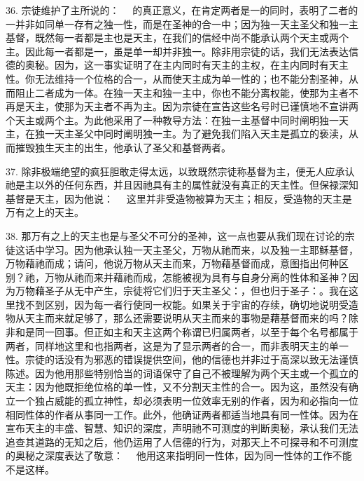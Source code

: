 36. 宗徒维护了主所说的：　 的真正意义，在肯定两者是一的同时，表明了二者的一并非如同单一存有之独一性，而是在圣神的合一中；因为独一天主圣父和独一主基督，既然每一者都是主也是天主，在我们的信经中尚不能承认两个天主或两个主。因此每一者都是一，虽是单一却并非独一。除非用宗徒的话，我们无法表达信德的奥秘。因为，这一事实证明了在主内同时有天主的主权，在主内同时有天主性。你无法维持一个位格的合一，从而使天主成为单一性的；也不能分割圣神，从而阻止二者成为一体。在独一天主和独一主中，你也不能分离权能，使那为主者不再是天主，使那为天主者不再为主。因为宗徒在宣告这些名号时已谨慎地不宣讲两个天主或两个主。为此他采用了一种教导方法：在独一主基督中同时阐明独一天主，在独一天主圣父中同时阐明独一主。为了避免我们陷入天主是孤立的亵渎，从而摧毁独生天主的出生，他承认了圣父和基督两者。\par

37. 除非极端绝望的疯狂胆敢走得太远，以致既然宗徒称基督为主，便无人应承认祂是主以外的任何东西，并且因祂具有主的属性就没有真正的天主性。但保禄深知基督是天主，因为他说：　 这里并非受造物被算为天主；相反，受造物的天主是万有之上的天主。\par

38. 那万有之上的天主也是与圣父不可分的圣神，这一点也要从我们现在讨论的宗徒这话中学习。因为他承认独一天主圣父，万物从祂而来，以及独一主耶稣基督，万物藉祂而成；请问，他说万物从天主而来，万物藉基督而成，意图指出何种区别？祂，万物从祂而来并藉祂而成，怎能被视为具有与自身分离的性体和圣神？因为万物藉圣子从无中产生，宗徒将它们归于天主圣父：，但也归于圣子：。我在这里找不到区别，因为每一者行使同一权能。如果关于宇宙的存续，确切地说明受造物从天主而来就足够了，那么还需要说明从天主而来的事物是藉基督而来的吗？除非和是同一回事。但正如主和天主这两个称谓已归属两者，以至于每个名号都属于两者，同样地这里和也指两者，这是为了显示两者的合一，而非表明天主的单一性。宗徒的话没有为邪恶的错误提供空间，他的信德也并非过于高深以致无法谨慎陈述。因为他用那些特别恰当的词语保守了自己不被理解为两个天主或一个孤立的天主：因为他既拒绝位格的单一性，又不分割天主性的合一。因为这，虽然没有确立一个独占威能的孤立神性，却必须表明一位效率无别的作者，因为和必指向一位相同性体的作者从事同一工作。此外，他确证两者都适当地具有同一性体。因为在宣布天主的丰盛、智慧、知识的深度，声明祂不可测度的判断奥秘，承认我们无法追查其道路的无知之后，他仍运用了人信德的行为，对那天上不可探寻和不可测度的奥秘之深度表达了敬意：　 他用这来指明同一性体，因为同一性体的工作不能不是这样。\par

